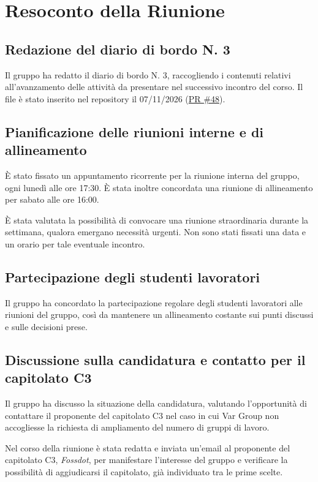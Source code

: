 \documentclass[a4paper, 11pt]{article}
\begin{document}
\newpage
\section{Resoconto della Riunione}

\subsection{Redazione del diario di bordo N. 3}
Il gruppo ha redatto il diario di bordo N. 3, raccogliendo i contenuti relativi all'avanzamento delle attività da presentare nel successivo incontro del corso. Il file è stato inserito nel repository il 07/11/2026 (\href{https://github.com/BitCrusher-Team/Progetto_SWE_26-27/pull/48}{PR \#48}).

\subsection{Pianificazione delle riunioni interne e di allineamento}
È stato fissato un appuntamento ricorrente per la riunione interna del gruppo, ogni lunedì alle ore 17:30. È stata inoltre concordata una riunione di allineamento per sabato alle ore 16:00.

È stata valutata la possibilità di convocare una riunione straordinaria durante la settimana, qualora emergano necessità urgenti. Non sono stati fissati una data e un orario per tale eventuale incontro.

\subsection{Partecipazione degli studenti lavoratori}
Il gruppo ha concordato la partecipazione regolare degli studenti lavoratori alle riunioni del gruppo, così da mantenere un allineamento costante sui punti discussi e sulle decisioni prese.

\subsection{Discussione sulla candidatura e contatto per il capitolato C3}
Il gruppo ha discusso la situazione della candidatura, valutando l'opportunità di contattare il proponente del capitolato C3 nel caso in cui Var Group non accogliesse la richiesta di ampliamento del numero di gruppi di lavoro.

Nel corso della riunione è stata redatta e inviata un'email al proponente del capitolato C3, \emph{Fossdot}, per manifestare l'interesse del gruppo e verificare la possibilità di aggiudicarsi il capitolato, già individuato tra le prime scelte.
\end{document}
